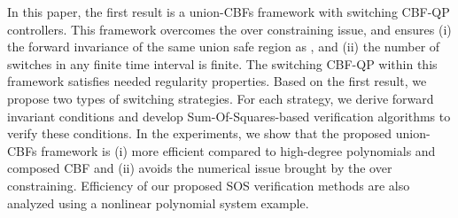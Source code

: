 \documentclass[letterpaper, 10 pt, conference]{ieeeconf}  %
\begin{document}


In this paper, the first result is a union-CBFs framework with switching CBF-QP controllers. This framework overcomes the over constraining issue, and ensures (i) the forward invariance of the same union safe region as \cite{glotfelter2020nonsmooth, vahs2024non}, and (ii) the number of switches in any finite time interval is finite. The switching CBF-QP within this framework satisfies needed regularity properties. Based on the first result, we propose two types of switching strategies. For each strategy, we derive forward invariant conditions and develop Sum-Of-Squares-based verification algorithms to verify these conditions. In the experiments, we show that the proposed union-CBFs framework is (i) more efficient compared to high-degree polynomials and composed CBF and (ii) avoids the numerical issue brought by the over constraining. Efficiency of our proposed SOS verification methods are also analyzed using a nonlinear polynomial system example.
\end{document}

